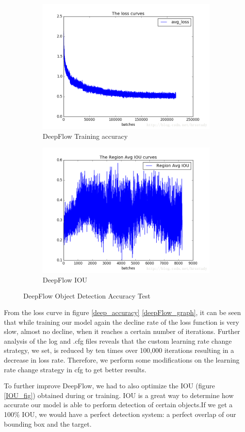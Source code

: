 \newpage
\begin{figure}
\centering
\begin{subfigure}{.5\textwidth}
  \centering
  \includegraphics[width=.5\linewidth]{figures/curve_loss.png}
  \caption{DeepFlow Training accuracy}
  \label{fig:deepFlow_graph}
\end{subfigure}%
\begin{subfigure}{.5\textwidth}
  \centering
  \includegraphics[width=.5\linewidth]{figures/avg_IOU.png}
  \caption{DeepFlow IOU}
  \label{fig:DeepFlow_IOU}
\end{subfigure}
\caption{DeepFlow Object Detection Accuracy Test}
\label{fig:deep_accuracy}
\end{figure}

From the loss curve  in figure \ref{deep_accuracy} \ref{deepFlow_graph}, it can be seen that while training our model again the decline rate of the loss function is very slow, almost no decline, when it reaches a certain number of iterations. Further analysis of the log and .cfg files reveals that the custom learning rate change strategy, we set, is reduced by ten times over 100,000 iterations resulting in a decrease in loss rate. Therefore, we perform some modifications on the learning rate change strategy in cfg to get better results.

To further improve DeepFlow, we had to also optimize the IOU (figure \ref{IOU_fig}) obtained during or training. IOU is a great way to determine how accurate our model is able to perform detection of certain objects.If we get a 100\% IOU, we would have a perfect detection system: a perfect overlap of our bounding box and the target. 

